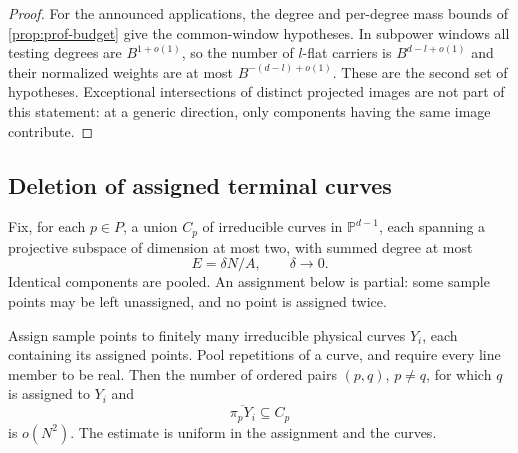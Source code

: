 \begin{proof}
For the announced applications, the degree and per-degree mass bounds of \cref{prop:prof-budget} give the common-window hypotheses. In subpower windows all testing degrees are $B^{1+o(1)}$, so the number of $l$-flat carriers is $B^{d-l+o(1)}$ and their normalized weights are at most $B^{-(d-l)+o(1)}$. These are the second set of hypotheses. Exceptional intersections of distinct projected images are not part of this statement: at a generic direction, only components having the same image contribute.
\end{proof}

\subsection{Deletion of assigned terminal curves}

Fix, for each $p\in P$, a union $C_p$ of irreducible curves in $\mathbb{P}^{d-1}$, each spanning a projective subspace of dimension at most two, with summed degree at most
\[
 E=\delta N/A,\qquad \delta\longrightarrow0.
\]
Identical components are pooled. An assignment below is partial: some sample points may be left unassigned, and no point is assigned twice.

\begin{proposition}\label{prop:geo-terminal}
Assign sample points to finitely many irreducible physical curves $Y_i$, each containing its assigned points. Pool repetitions of a curve, and require every line member to be real. Then the number of ordered pairs $(p,q)$, $p\ne q$, for which $q$ is assigned to $Y_i$ and
\[
 \overline{\pi_pY_i}\subseteq C_p
\]
is $o(N^2)$. The estimate is uniform in the assignment and the curves.
\end{proposition}

